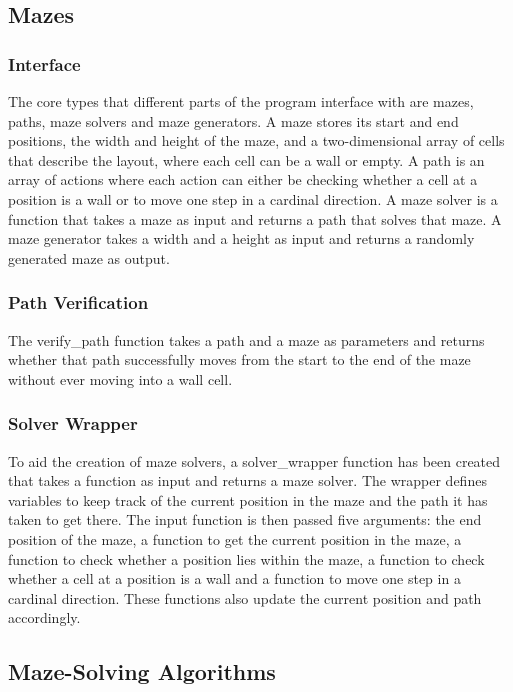 \subsection{Mazes}

\subsubsection{Interface}

The core types that different parts of the program interface with are mazes, paths, maze solvers and maze generators. A maze stores its start and end positions, the width and height of the maze, and a two-dimensional array of cells that describe the layout, where each cell can be a wall or empty. A path is an array of actions where each action can either be checking whether a cell at a position is a wall or to move one step in a cardinal direction. A maze solver is a function that takes a maze as input and returns a path that solves that maze. A maze generator takes a width and a height as input and returns a randomly generated maze as output.

\subsubsection{Path Verification}

The verify\_path function takes a path and a maze as parameters and returns whether that path successfully moves from the start to the end of the maze without ever moving into a wall cell.

\subsubsection{Solver Wrapper}

To aid the creation of maze solvers, a solver\_wrapper function has been created that takes a function as input and returns a maze solver. The wrapper defines variables to keep track of the current position in the maze and the path it has taken to get there. The input function is then passed five arguments: the end position of the maze, a function to get the current position in the maze, a function to check whether a position lies within the maze, a function to check whether a cell at a position is a wall and a function to move one step in a cardinal direction. These functions also update the current position and path accordingly.

\subsection{Maze-Solving Algorithms}

